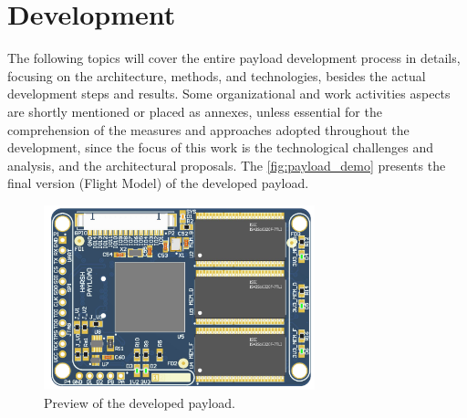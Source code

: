 %
%
%
%
%

%
%
%
%
%

\newpage


\section{Development} \label{sec:development}

The following topics will cover the entire payload development process in details, focusing on the architecture, methods, and technologies, besides the actual development steps and results. Some organizational and work activities aspects are shortly mentioned or placed as annexes, unless essential for the comprehension of the measures and approaches adopted throughout the development, since the focus of this work is the technological challenges and analysis, and the architectural proposals. The \autoref{fig:payload_demo} presents the final version (Flight Model) of the developed payload. 

\begin{figure}[!ht]
    \begin{center}
        \includegraphics[width=0.7\textwidth]{figures/harsh_pcb_top.png}
        \caption{Preview of the developed payload.}
        \label{fig:payload_demo}
    \end{center}
\end{figure}

